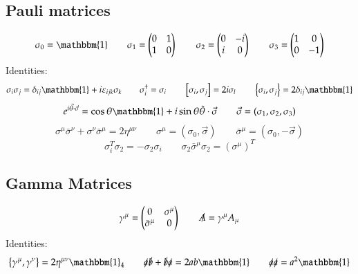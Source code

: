 \documentclass{article}
\begin{document}
\subsection{Pauli matrices}
\begin{equation*}
    \sigma_0 = \mathbbm{1}
    \qquad
    \sigma_1 = \begin{pmatrix} 0 & 1 \\ 1 & 0 \end{pmatrix}
    \qquad
    \sigma_2 = \begin{pmatrix} 0 & -i \\ i & 0 \end{pmatrix}
    \qquad
    \sigma_3 = \begin{pmatrix} 1 & 0 \\ 0 & -1 \end{pmatrix}
\end{equation*}
Identities:
\begin{equation*}
    \sigma_i \sigma_j = \delta_{ij} \mathbbm{1} + i\varepsilon_{ijk} \sigma_k
    \qquad
    \sigma_i^\dagger = \sigma_i
    \qquad
    \left[\sigma_i, \sigma_j\right] = 2i\sigma_l
    \qquad
    \left\{\sigma_i, \sigma_j\right\} = 2\delta_{ij} \mathbbm{1}
\end{equation*}
\begin{equation*}
    e^{i\vec{\theta}\cdot\vec{\sigma}} = \cos\theta \mathbbm{1} + i\sin\theta \hat{\theta}\cdot\vec{\sigma}
    \qquad
    \vec{\sigma} = (\sigma_1, \sigma_2, \sigma_3)
\end{equation*}
\begin{equation*}
    \sigma^\mu\bar{\sigma}^\nu + \sigma^\nu\bar{\sigma}^\mu = 2\eta^{\mu\nu}
    \qquad
    \sigma^\mu = (\sigma_0, \vec{\sigma})
    \qquad
    \bar{\sigma}^\mu = (\sigma_0, -\vec{\sigma})
\end{equation*}
\begin{equation*}
    \sigma_i^T\sigma_2 = -\sigma_2\sigma_i
    \qquad
    \sigma_2 \bar{\sigma}^\mu\sigma_2 = \left(\sigma^\mu\right)^T
\end{equation*}

\subsection{Gamma Matrices}
\begin{equation*}
    \gamma^\mu = \begin{pmatrix}
        0 & \sigma^\mu \\ \bar{\sigma}^\mu & 0
    \end{pmatrix}
    \qquad
    \slashed{A} = \gamma^\mu A_\mu
\end{equation*}
Identities:
\begin{equation*}
    \left\{\gamma^\mu, \gamma^\nu\right\} = 2\eta^{\mu\nu}\mathbbm{1}_4
    \qquad
    \slashed{a}\slashed{b} + \slashed{b}\slashed{a} = 2ab\mathbbm{1}
    \qquad
    \slashed{a}\slashed{a} = a^2\mathbbm{1}
\end{equation*}
\end{document}
